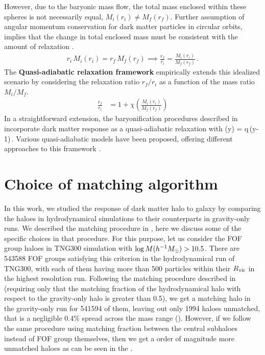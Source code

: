 However, due to the baryonic mass flow, the total mass enclosed within these spheres is not necessarily equal, \( M_i(r_i) \neq M_f(r_f) \). Further assumption of angular momentum conservation for dark matter particles in circular orbits, implies that the change in total enclosed mass must be consistent with the amount of relaxation \citep[][]{1986ApJ...301...27B}.
\begin{align}
    r_i \,M_i(r_i) = r_f \,M_f(r_f) %
    \implies 
    \frac{r_f}{r_i} = \frac{M_i(r_i)}{M_f(r_f)}\,. 
\label{eq:AR}
\end{align}
% 
The \textbf{Quasi-adiabatic relaxation framework} empirically extends this idealized scenario by considering the relaxation ratio \( r_f/r_i \) as a function of the mass ratio \( M_i/M_f \).
\begin{align}
\frac{r_f}{r_i} &= 1 + \chi \left( \frac{M_i(r_i)}{M_f(r_f)} \right) 
\label{eq:qAR}
\end{align}
In a straightforward extension, the baryonification procedures described in \cite{2015JCAP...12..049S,2021MNRAS.503.4147P} incorporate dark matter response as a quasi-adiabatic relaxation with 
\be
\chi(y) = q\,(y-1)\,.
\label{eq:chi-linear}
\ee
Various quasi-adiabatic models have been proposed, offering different approaches to this framework \citep{2010MNRAS.407..435A,2004ApJ...616...16G,2023Velmani&Paranjape}.





\section{Choice of matching algorithm}
\label{sec:apndx-matching-ch:z0main}
In this work, we studied the response of dark matter halo to galaxy by comparing the haloes in hydrodynamical simulations to their counterparts in gravity-only runs. We described the matching procedure in , here we discuss some of the specific choices in that procedure.
For this purpose, let us consider the FOF group haloes in TNG300 simulation with $\log M(h^{-1}M_{\odot})>10.5$.  There are 543588 FOF groups satisfying this criterion in the hydrodynamical run of TNG300, with each of them having more than 500 particles within their $R_{\rm vir}$ in the highest resolution run.
Following the matching procedure described in  (requiring only that the matching fraction of the hydrodynamical halo with respect to the gravity-only halo is greater than 0.5), we get a matching halo in the gravity-only run for 541594 of them, leaving out only 1994 haloes unmatched, that is a negligible 0.4\% spread across the mass range ().
However, if we follow the same procedure using matching fraction between the central subhaloes instead of FOF group themselves, then we get a order of magnitude more unmatched haloes as can be seen in the .  

